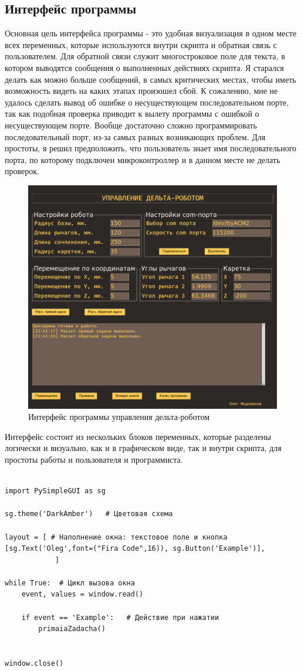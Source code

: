 \subsection{Интерфейс программы}

Основная цель интерфейса программы - это удобная визуализация в одном месте всех переменных, которые используются внутри скрипта и обратная связь с пользователем. Для обратной связи служит многостроковое поле для текста, в котором выводятся сообщения о выполненных действиях скрипта. Я старался делать как можно больше сообщений, в самых критических местах, чтобы иметь возможность видеть на каких этапах произошел сбой. К сожалению, мне не удалось сделать вывод об ошибке о несуществующем последовательном порте, так как подобная проверка приводит к вылету программы с ошибкой о несуществующем порте. Вообще достаточно сложно программировать последовательный порт, из-за самых разных возникающих проблем. Для простоты, я решил предположить, что пользователь знает имя последовательного порта, по которому подключен микроконтроллер и в данном месте не делать проверок.

\begin{figure}[h!]
\centering
\includegraphics[width=0.8\linewidth]{./image/gui}
\caption{Интерфейс программы управления дельта-роботом}
\end{figure}

Интерфейс состоит из нескольких блоков переменных, которые разделены логически и визуально, как и в графическом виде, так и внутри скрипта, для простоты работы и пользователя и программиста. 


\begin{lstlisting}[style=python,caption=Использование PySimpleGui]

import PySimpleGUI as sg

sg.theme('DarkAmber')   # Цветовая схема

layout = [ # Наполнение окна: текстовое поле и кнопка
[sg.Text('Oleg',font=("Fira Code",16)), sg.Button('Example')],
            ]

while True:  # Цикл вызова окна
    event, values = window.read()

    if event == 'Example':   # Действие при нажатии 
        primaiaZadacha()


window.close()
\end{lstlisting}

